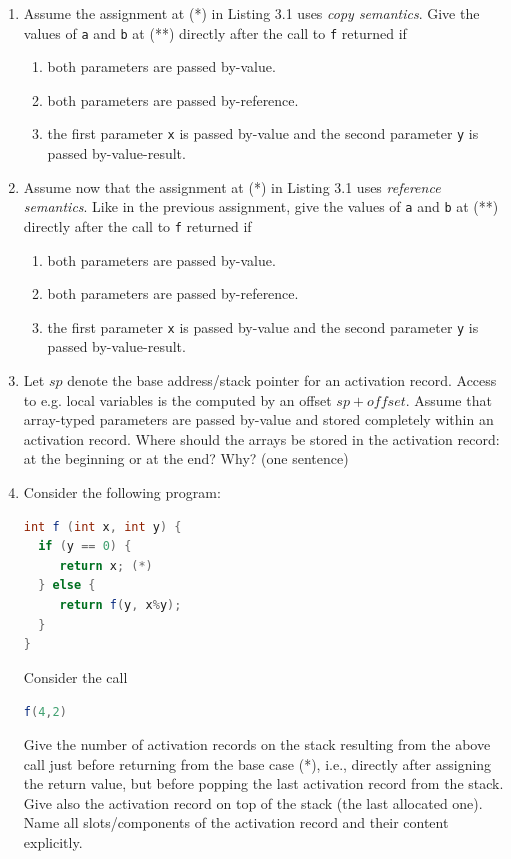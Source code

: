 \documentclass{article}
\newcommand{\comment}[1]{\marginpar{#1}}
\begin{document}
\begin{enumerate}
\item \comment{\textbf{3 points}} Assume the assignment at (*) in
  Listing 3.1 uses
  \emph{copy semantics}. Give the values of \texttt{a} and \texttt{b}
  at (**) directly after the call to \texttt{f} returned if
  \begin{enumerate}
  \item both parameters are passed by-value.
  \item both parameters are passed by-reference.
  \item the first parameter \texttt{x} is passed by-value and the
    second parameter \texttt{y} is passed by-value-result.
  \end{enumerate} 
\item \comment{\textbf{3 points}} Assume now that the assignment at
  (*) in Listing 3.1 uses \emph{reference semantics}. Like in the
  previous assignment, give the values of \texttt{a} and \texttt{b} at
  (**) directly after the call to \texttt{f} returned if
  \begin{enumerate}
  \item both parameters are passed by-value.
  \item both parameters are passed by-reference.
  \item the first parameter \texttt{x} is passed by-value and the
    second parameter \texttt{y} is passed by-value-result. 
  \end{enumerate} 
\item \comment{\textbf{2 points}} Let $sp$ denote the base
  address/stack pointer for an activation record. Access to e.g. local
  variables is the computed by an offset $sp+\mathit{offset}$. Assume
  that array-typed parameters are passed by-value and stored
  completely within an activation record. Where should the arrays be
  stored in the activation record: at the beginning or at the end? Why?
  (one sentence) \newpage
\item \comment{\textbf{2 points}} Consider the following program:
\begin{lstlisting}[language=Java, columns=flexible]
int f (int x, int y) {
  if (y == 0) { 
     return x; (*) 
  } else {
     return f(y, x%y);
  }
}
\end{lstlisting}
Consider the call 
\begin{center}
  \lstinline[language=Java, columns=flexible]{f(4,2)} 
\end{center}
Give the number of activation records on the stack resulting from the
above call just before returning from the base case (*), i.e.,
directly after assigning the return value, but before popping the last
activation record from the stack. Give also the activation record on
top of the stack (the last allocated one). Name all slots/components
of the activation record and their content explicitly.
\end{enumerate}
\end{document}
